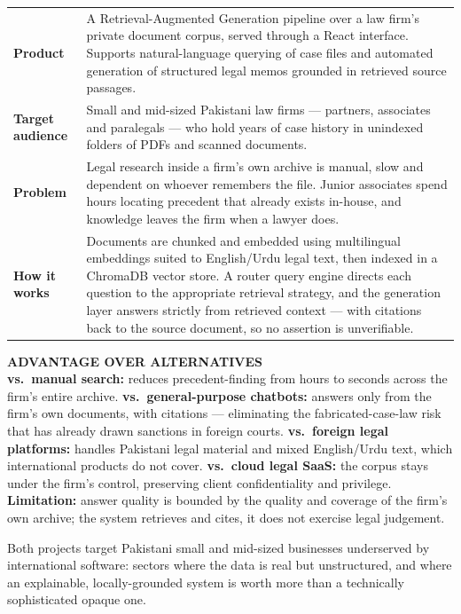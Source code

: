 \documentclass[10pt,a4paper]{article}
\newcommand{\lbl}[1]{{\color{navy}\bfseries\footnotesize #1}}
\begin{document}
\begin{tabularx}{\textwidth}{@{}p{2.75cm}X@{}}
\lbl{Product} &
A Retrieval-Augmented Generation pipeline over a law firm's private document corpus, served through a React interface. Supports natural-language querying of case files and automated generation of structured legal memos grounded in retrieved source passages. \\[1pt]

\lbl{Target audience} &
Small and mid-sized Pakistani law firms --- partners, associates and paralegals --- who hold years of case history in unindexed folders of PDFs and scanned documents. \\[1pt]

\lbl{Problem} &
Legal research inside a firm's own archive is manual, slow and dependent on whoever remembers the file. Junior associates spend hours locating precedent that already exists in-house, and knowledge leaves the firm when a lawyer does. \\[1pt]

\lbl{How it works} &
Documents are chunked and embedded using multilingual embeddings suited to English/Urdu legal text, then indexed in a ChromaDB vector store. A router query engine directs each question to the appropriate retrieval strategy, and the generation layer answers strictly from retrieved context --- with citations back to the source document, so no assertion is unverifiable. \\
\end{tabularx}

\vspace{3pt}
\begin{tcolorbox}[colback=parch,colframe=rule,boxrule=0.4pt,arc=1.5pt,
                  left=6pt,right=6pt,top=4pt,bottom=4pt]
{\color{navy}\bfseries\footnotesize ADVANTAGE OVER ALTERNATIVES}\\[2pt]
\footnotesize
\textbf{vs.\ manual search:} reduces precedent-finding from hours to seconds across the firm's entire archive.\;
\textbf{vs.\ general-purpose chatbots:} answers only from the firm's own documents, with citations --- eliminating the fabricated-case-law risk that has already drawn sanctions in foreign courts.\;
\textbf{vs.\ foreign legal platforms:} handles Pakistani legal material and mixed English/Urdu text, which international products do not cover.\;
\textbf{vs.\ cloud legal SaaS:} the corpus stays under the firm's control, preserving client confidentiality and privilege.\\[3pt]
{\color{slate}\scriptsize \textbf{Limitation:} answer quality is bounded by the quality and coverage of the firm's own archive; the system retrieves and cites, it does not exercise legal judgement.}
\end{tcolorbox}

\vspace{6pt}
{\color{slate}\scriptsize
Both projects target Pakistani small and mid-sized businesses underserved by international software: sectors where the data is real but unstructured, and where an explainable, locally-grounded system is worth more than a technically sophisticated opaque one.}
\end{document}

